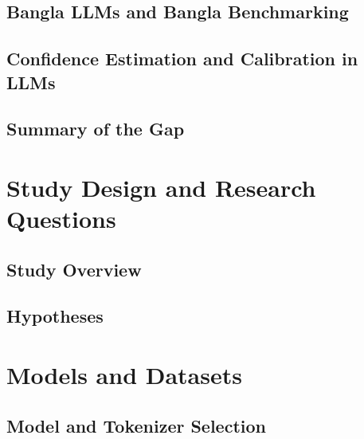 \documentclass[runningheads]{llncs}
\begin{document}
\subsection{Bangla LLMs and Bangla Benchmarking}

\subsection{Confidence Estimation and Calibration in LLMs}

\subsection{Summary of the Gap}

\section{Study Design and Research Questions}
\subsection{Study Overview}

\subsection{Hypotheses}

\section{Models and Datasets}

\subsection{Model and Tokenizer Selection}
\end{document}
